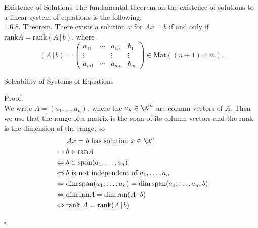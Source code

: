 \documentclass[smaller,hyperref={CJKbookmarks=true}]{beamer}
\begin{document}
\begin{frame}[t]{Existence of Solutions}
The fundamental theorem on the existence of solutions to a linear system of equations is the following:\\
\alert{1.6.8. Theorem.} There exists a solution $x$ for $Ax=b$ if and only if $\text{rank}A=\text{rank}(A\,|\,b)$, where
\[(A\,|\,b)=\begin{pmatrix}
          a_{11} & \cdots & a_{1n} & b_1 \\
          \vdots &   & \vdots & \vdots
           \\
          a_{m1} & \cdots & a_{mn} & b_m
        \end{pmatrix}\in\text{Mat}((n+1)\times m).\]
\end{frame}
\begin{frame}[t]{Solvability of Systems of Equations}
\begin{spacing}{1}
\alert{Proof.}\\
We write $A=(a_1,\ldots,a_n)$, where the $a_k\in\R^m$ are column vectors of $A$. Then we use that the range of a matrix is the span of its column vectors and the rank is the dimension of the range, so
\begin{equation*}
  \begin{split}
       &~~~~~Ax=b~\text{has solution} ~x\in\R^n \\
       &\Leftrightarrow b\in\text{ran}A  \\
       &\Leftrightarrow b\in\text{span}(a_1,\ldots,a_n)  \\
       &\Leftrightarrow b ~\text{is not independent of}~ a_1,\ldots,a_n  \\
       &\Leftrightarrow \dim\text{span}(a_1,\ldots,a_n)=\dim\text{span}(a_1,\ldots,a_n,b)  \\
       &\Leftrightarrow \dim\text{ran}A=\dim\text{ran}(A\,|\,b)   \\
       &\Leftrightarrow \text{rank}~A=\text{rank}(A\,|\,b)
  \end{split}
\end{equation*}
\begin{flushright}
  $\square$
\end{flushright}
\end{spacing}
\end{frame}
\end{document}
